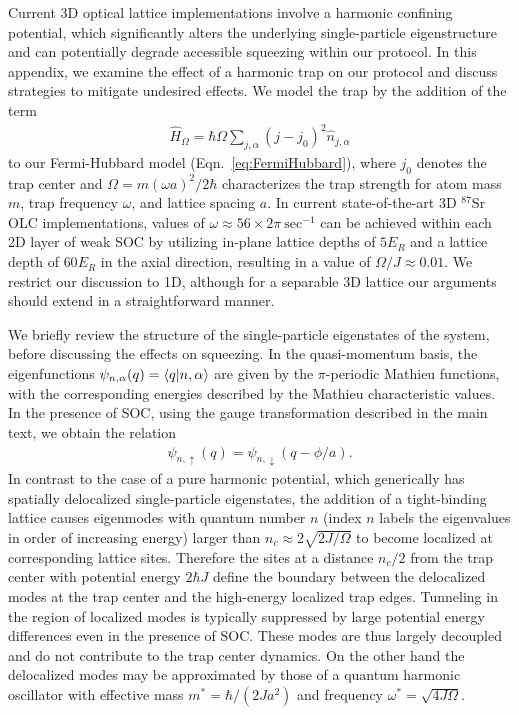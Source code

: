 \documentclass[aps,prx,superscriptaddress,notitlepage,twocolumn,longbibliography]{revtex4-1}
\renewcommand{\t}{\text} %
\begin{document}
Current 3D optical lattice implementations involve a harmonic confining potential, which significantly alters the underlying single-particle eigenstructure and can potentially degrade accessible squeezing within our protocol. In this appendix, we examine the effect of a harmonic trap on our protocol and discuss strategies to mitigate undesired effects. We model the trap by the addition of the term
\begin{align}
    \hat{H}_{\Omega} = \hbar\Omega\sum_{j,\alpha}(j-j_0)^2\hat{n}_{j,\alpha}
\end{align}
to our Fermi-Hubbard model (Eqn.~\eqref{eq:FermiHubbard}), where $j_0$ denotes the trap center and $\Omega = m(\omega a)^2/2\hbar$ characterizes the trap strength for atom mass $m$, trap frequency $\omega$, and lattice spacing $a$. In current state-of-the-art 3D $^{87}$Sr OLC implementations, values of $\omega \approx 56 \times 2\pi~\t{sec}^{-1}$ can be achieved within each 2D layer of weak SOC by utilizing in-plane lattice depths of $5 E_R$ and a lattice depth of $60 E_R$ in the axial direction, resulting in a value of $\Omega/J \approx 0.01$. We restrict our discussion to 1D, although for a separable 3D lattice our arguments should extend in a straightforward manner.

We briefly review the structure of the single-particle eigenstates of the system, before discussing the effects on squeezing. In the quasi-momentum basis, the eigenfunctions $\psi_{n,\alpha}(q) = \braket{q|n,\alpha}$ are given by the $\pi$-periodic Mathieu functions, with the corresponding energies described by the Mathieu characteristic values\cite{Rey2005}. In the presence of SOC, using  the gauge transformation described in the main text, we obtain the relation
\begin{gather}
    \psi_{n,\uparrow}(q) = \psi_{n,\downarrow}(q-\phi/a).
    \label{eq:trap_states}
\end{gather}
In contrast to the case of a pure harmonic potential, which generically has spatially delocalized single-particle eigenstates, the addition of a tight-binding lattice causes eigenmodes with quantum number $n$ (index $n$ labels the eigenvalues in order of increasing energy) larger than $n_c \approx 2\sqrt{2J/\Omega}$ to become localized at corresponding lattice sites. Therefore the  sites at a distance $n_c/2$ from the trap center with  potential energy $2\hbar J$ define  the boundary between the delocalized modes at the trap center and the high-energy localized trap edges. Tunneling in the region of  localized modes is typically suppressed by large potential energy differences even in the presence of SOC. These modes are thus largely decoupled and do not contribute to the trap center dynamics. On the other hand the delocalized modes may be approximated by those of a quantum harmonic oscillator with effective mass $m^{*} = \hbar/(2Ja^2)$ and frequency $\omega^* = \sqrt{4J\Omega}$.
\end{document}
